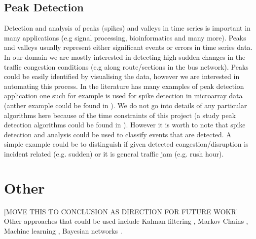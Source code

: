 \subsection{Peak Detection}
Detection and analysis of peaks (spikes) and valleys in time series is important in many applications (e.g signal processing, bioinformatics and many more). Peaks and valleys usually represent either significant events or errors in time series data. In our domain we are mostly interested in detecting high sudden changes in the traffic congestion conditions (e.g along route/sections in the bus network). Peaks could be easily identified by visualising the data, however we are interested in automating this process. In the literature has many examples of peak detection application one such for example is \cite{simplePeakDetection} used for spike detection in microarray data (anther example could be found in \cite{Azami2014491}). We do not go into details of any particular algorithms here because of the time constraints of this project (a study peak detection algorithms could be found in \cite{ventzas2011peak}). However it is worth to note that spike detection and analysis could be used to classify events that are detected. A simple example could be to distinguish if given detected congestion/disruption is incident related (e.g. sudden) or it is general traffic jam (e.g. rush hour).

\section{Other}
[MOVE THIS TO CONCLUSION AS DIRECTION FOR FUTURE WOKR]
Other approaches that could be used include Kalman filtering \cite{kalmanFiltering} \cite{Guo201450}, Markov Chains \cite{Qi201495} \cite{Ramezani20121576}, Machine learning \cite{herring2010real}, Bayesian networks \cite{Wang201479}. 




